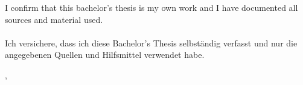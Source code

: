\cleardoublepage{}

\thispagestyle{empty}
\vspace*{0.6\textheight}
\noindent
\makeatletter
{}
{I confirm that this bachelor’s thesis is my own work and I have documented all sources and material used. \\ \\
Ich versichere, dass ich diese Bachelor’s Thesis selbständig verfasst und nur die angegebenen Quellen und Hilfsmittel verwendet habe.}
\makeatother

\vspace{15mm}
\noindent
\getSubmissionLocation{}, \getSubmissionDate{} \hspace{50mm} \getAuthor{}

\cleardoublepage{}
